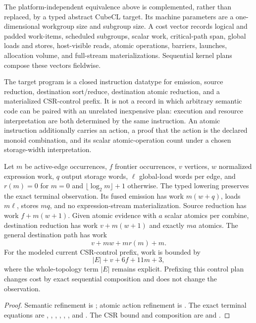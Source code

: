 The platform-independent equivalence above is complemented, rather than
replaced, by a typed abstract CubeCL target.  Its machine parameters are a
one-dimensional workgroup size and subgroup size.  A cost vector records
logical and padded work-items, scheduled subgroups, scalar work, critical-path
span, global loads and stores, host-visible reads, atomic operations, barriers,
launches, allocation volume, and full-stream materializations.  Sequential
kernel plans compose these vectors fieldwise.

The target program is a closed instruction datatype for emission, source
reduction, destination sort/reduce, destination atomic reduction, and a
materialized CSR-control prefix.  It is not a record in which arbitrary
semantic code can be paired with an unrelated inexpensive plan: execution and
resource interpretation are both determined by the same instruction.  An
atomic instruction additionally carries an action, a proof that the action is
the declared monoid combination, and its scalar atomic-operation count under a
chosen storage-width interpretation.

\begin{theorem}
\label{thm:cubecl-resource}
Let $m$ be active-edge occurrences, $f$ frontier occurrences, $v$ vertices,
$w$ normalized expression work, $q$ output storage words, $\ell$ global-load
words per edge, and $r(m)=0$ for $m=0$ and
$\lfloor\log_2 m\rfloor+1$ otherwise.  The typed lowering preserves the exact
terminal observation.  Its fused emission has work $m(w+q)$, loads $m\ell$,
stores $mq$, and no expression-stream materialization.  Source reduction has
work $f+m(w+1)$.  Given atomic evidence with $a$ scalar atomics per combine,
destination reduction has work $v+m(w+1)$ and exactly $ma$ atomics.  The
general destination path has work
\[
  v + mw + m r(m) + m.
\]
For the modeled current CSR-control prefix, work is bounded by
\[
  |E| + v + 6f + 11m + 3,
\]
where the whole-topology term $|E|$ remains explicit.  Prefixing this control
plan changes cost by exact sequential composition and does not change the
observation.
\end{theorem}

\begin{proof}\raggedright
Semantic refinement is ; atomic action refinement
is .  The exact terminal equations are
, ,
, ,
,
, and
.  The CSR bound and composition are
 and
.
\end{proof}

